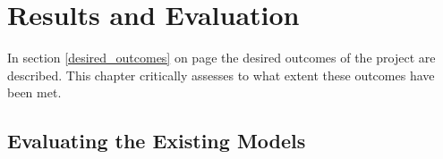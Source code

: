 \chapter{Results and Evaluation}

In section \ref{desired_outcomes} on page \pageref{desired_outcomes} the desired outcomes of the project are described. This chapter critically assesses to what extent these outcomes have been met.

\section{Evaluating the Existing Models}

